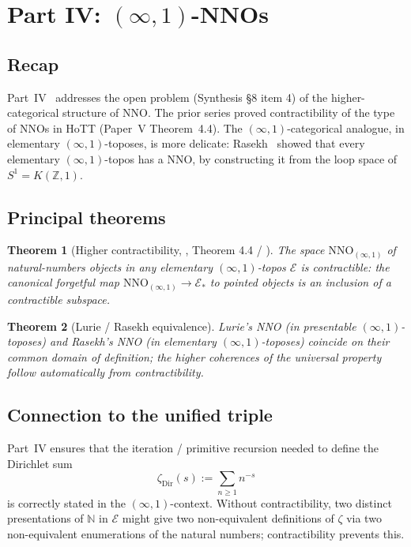\documentclass[12pt]{article}
\newtheorem{theorem}{Theorem}[section]
\theoremstyle{definition}
\theoremstyle{remark}
\newcommand{\N}{\mathbb{N}}
\newcommand{\Z}{\mathbb{Z}}
\newcommand{\NNO}{\mathrm{NNO}}
\begin{document}
\section{Part IV: \texorpdfstring{$(\infty,1)$}{(infinity,1)}-NNOs}\label{sec:partIV}

\subsection{Recap}

Part~IV~\cite{infinityNno} addresses the open problem (Synthesis \S 8 item
4) of the higher-categorical structure of NNO\@. The prior series proved
contractibility of the type of NNOs in HoTT (Paper~V Theorem~4.4). The
$(\infty,1)$-categorical analogue, in elementary $(\infty,1)$-toposes, is
more delicate: Rasekh~\cite{Rasekh2018} showed that every elementary
$(\infty,1)$-topos has a NNO, by constructing it from the loop space of
$S^1 = K(\Z,1)$.

\subsection{Principal theorems}

\begin{theorem}[Higher contractibility,
\cite{infinityNno}, Theorem 4.4 / \cite{Rasekh2018}]
The space $\NNO_{(\infty,1)}$ of natural-numbers objects in any elementary
$(\infty,1)$-topos $\mathcal{E}$ is contractible: the canonical
forgetful map $\NNO_{(\infty,1)} \to \mathcal{E}_*$ to pointed objects is
an inclusion of a contractible subspace.
\end{theorem}

\begin{theorem}[Lurie / Rasekh equivalence]
Lurie's NNO (in presentable $(\infty,1)$-toposes) and Rasekh's NNO
(in elementary $(\infty,1)$-toposes) coincide on their common domain of
definition; the higher coherences of the universal property follow
automatically from contractibility.
\end{theorem}

\subsection{Connection to the unified triple}

Part~IV ensures that the iteration / primitive recursion needed to define
the Dirichlet sum
\[
\zeta_{\mathrm{Dir}}(s) := \sum_{n \geq 1} n^{-s}
\]
is correctly stated in the $(\infty,1)$-context. Without
contractibility, two distinct presentations of $\N$ in $\mathcal{E}$
might give two non-equivalent definitions of $\zeta$ via two
non-equivalent enumerations of the natural numbers; contractibility
prevents this.
\end{document}

